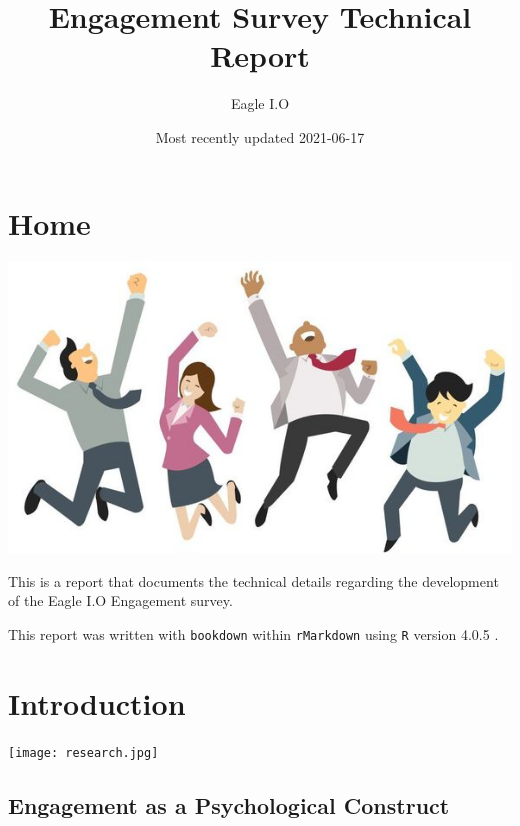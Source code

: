 \documentclass[
]{book}
\title{Engagement Survey Technical Report}
\author{Eagle I.O}
\date{Most recently updated 2021-06-17}
\begin{document}
\maketitle

{
\setcounter{tocdepth}{4}
\tableofcontents
}
\hypertarget{home}{%
\chapter*{Home}\label{home}}

\includegraphics{EE.jpeg}

This is a report that documents the technical details regarding the development of the Eagle I.O Engagement survey.

This report was written with \texttt{bookdown} \citep{R-bookdown} within \texttt{rMarkdown} \citep{R-markdown} using \texttt{R} version 4.0.5 \citep{R-base}.

\hypertarget{intro}{%
\chapter{Introduction}\label{intro}}

\texttt{[image: research.jpg]}

\hypertarget{engagement-as-a-psychological-construct}{%
\section{Engagement as a Psychological Construct}\label{engagement-as-a-psychological-construct}}
\end{document}

